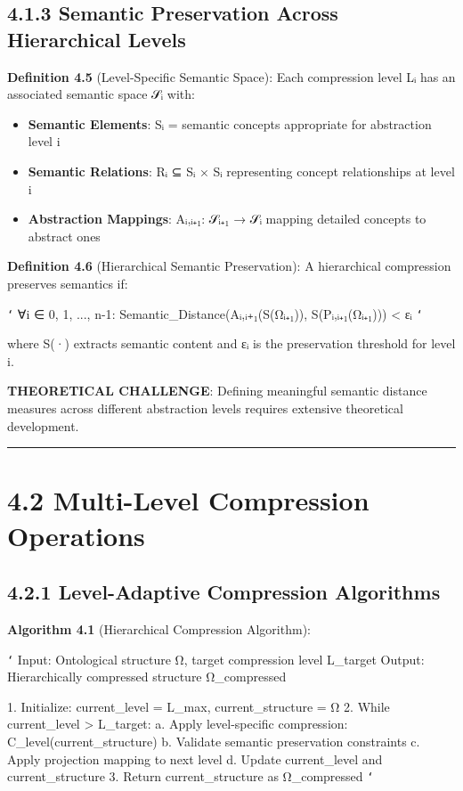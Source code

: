 \subsection{4.1.3 Semantic Preservation Across Hierarchical Levels}

\textbf{Definition 4.5} (Level-Specific Semantic Space): Each compression level Lᵢ has an associated semantic space 𝒮ᵢ with:

\begin{itemize}
\item \textbf{Semantic Elements}: Sᵢ = {semantic concepts appropriate for abstraction level i}
\item \textbf{Semantic Relations}: Rᵢ ⊆ Sᵢ × Sᵢ representing concept relationships at level i
\item \textbf{Abstraction Mappings}: Aᵢ,ᵢ₊₁: 𝒮ᵢ₊₁ → 𝒮ᵢ mapping detailed concepts to abstract ones
\end{itemize}

\textbf{Definition 4.6} (Hierarchical Semantic Preservation): A hierarchical compression preserves semantics if:

\texttt{`}
∀i ∈ {0, 1, ..., n-1}: Semantic_Distance(Aᵢ,ᵢ₊₁(S(Ωᵢ₊₁)), S(Pᵢ,ᵢ₊₁(Ωᵢ₊₁))) < εᵢ
\texttt{`}

where S(·) extracts semantic content and εᵢ is the preservation threshold for level i.

\textbf{THEORETICAL CHALLENGE}: Defining meaningful semantic distance measures across different abstraction levels requires extensive theoretical development.

\hrule

\section{4.2 Multi-Level Compression Operations}

\subsection{4.2.1 Level-Adaptive Compression Algorithms}

\textbf{Algorithm 4.1} (Hierarchical Compression Algorithm):

\texttt{`}
Input: Ontological structure Ω, target compression level L_target
Output: Hierarchically compressed structure Ω_compressed

1. Initialize: current_level = L_max, current_structure = Ω
2. While current_level > L_target:
   a. Apply level-specific compression: C_level(current_structure)
   b. Validate semantic preservation constraints
   c. Apply projection mapping to next level
   d. Update current_level and current_structure
3. Return current_structure as Ω_compressed
\texttt{`}

